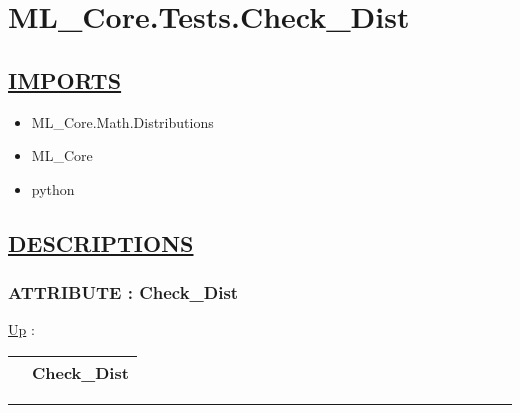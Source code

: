 \chapter*{ML\_Core.Tests.Check\_Dist}
\hypertarget{ecldoc:toc:ML_Core.Tests.Check_Dist}{}

\section*{\underline{IMPORTS}}
\begin{itemize}
\item ML\_Core.Math.Distributions
\item ML\_Core
\item python
\end{itemize}

\section*{\underline{DESCRIPTIONS}}
\subsection*{ATTRIBUTE : Check\_Dist}
\hypertarget{ecldoc:ml_core.tests.check_dist}{}
\hyperlink{ecldoc:toc:ML_Core/Tests}{Up} :

{\renewcommand{\arraystretch}{1.5}
\begin{tabularx}{\textwidth}{|>{\raggedright\arraybackslash}l|X|}
\hline
\hspace{0pt} & Check\_Dist \\
\hline
\end{tabularx}
}

\par


\rule{\linewidth}{0.5pt}

